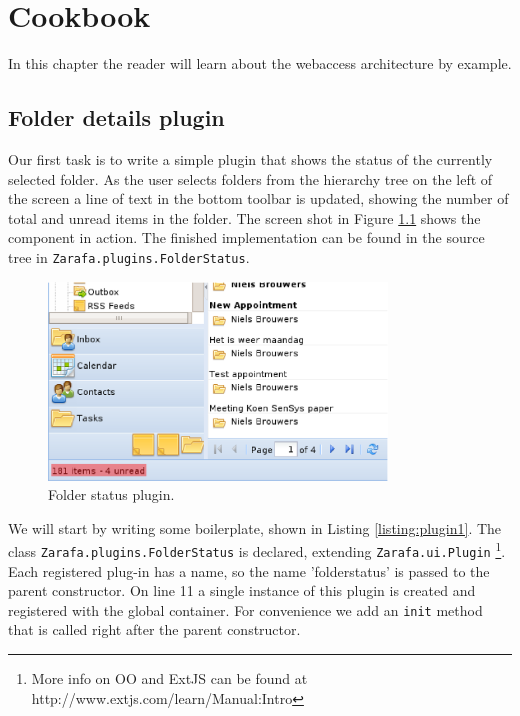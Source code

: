 \chapter{Cookbook}
\label{section:cookbook}

In this chapter the reader will learn about the webaccess architecture by example. 

\section{Folder details plugin}
\label{section:folderdetails}

Our first task is to write a simple plugin that shows the status of the currently selected folder.
As the user selects folders from the hierarchy tree on the left of the screen a line of text
in the bottom toolbar is updated, showing the number of total and unread items in the folder.
The screen shot in Figure \ref{figure:plugin} shows the component in action. The finished
implementation can be found in the source tree in {\tt Zarafa.plugins.FolderStatus}.

\begin{figure}[h!]
\centering
\includegraphics[width=9cm]{figures/plugin.eps}
\caption{Folder status plugin.}
\label{figure:plugin}
\end{figure}

We will start by writing some boilerplate, shown in Listing \ref{listing:plugin1}. The class 
{\tt Zarafa.plugins.FolderStatus} is declared, extending {\tt Zarafa.ui.Plugin}
\footnote{More info on OO and ExtJS can be found at http://www.extjs.com/learn/Manual:Intro}.
Each registered plug-in has a name, so the name 'folderstatus' is passed to the parent
constructor. On line 11 a single instance of this plugin is created and registered with the
global container. For convenience we add an {\tt init} method that is called right
after the parent constructor.


